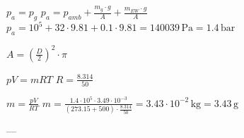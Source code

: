 \( p_a = p_g \)  
\( p_a = p_{amb} + \frac{m_g \cdot g}{A} + \frac{m_{EW} \cdot g}{A} \)  
\( p_a = 10^5 + 32 \cdot 9.81 + 0.1 \cdot 9.81 = 140039 \, \text{Pa} = 1.4 \, \text{bar} \)  

\( A = \left(\frac{D}{2}\right)^2 \cdot \pi \)  

\( pV = mRT \)  
\( R = \frac{8.314}{50} \)  

\( m = \frac{pV}{RT} \)  
\( m = \frac{1.4 \cdot 10^5 \cdot 3.49 \cdot 10^{-3}}{(273.15 + 500) \cdot \frac{8.314}{50}} = 3.43 \cdot 10^{-2} \, \text{kg} = 3.43 \, \text{g} \)  

---